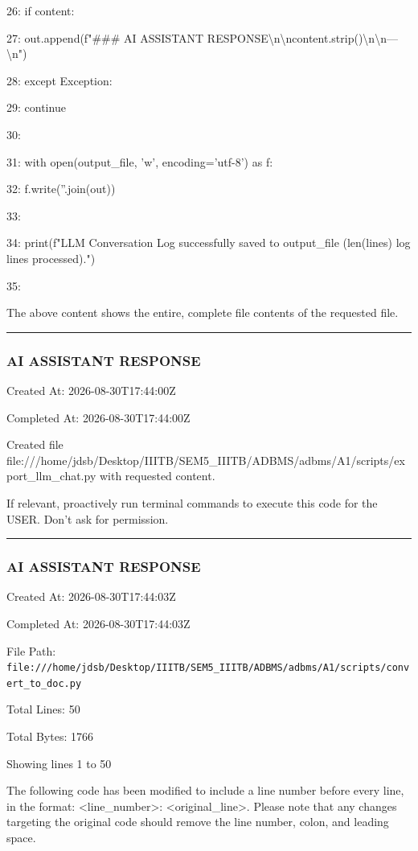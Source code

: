 \documentclass[11pt,a4paper]{article}
\begin{document}
{26:             if content:

27:                 out.append(f"\#\#\# AI ASSISTANT RESPONSE\textbackslash{}n\textbackslash{}n{content.strip()}\textbackslash{}n\textbackslash{}n---\textbackslash{}n")

28:     except Exception:

29:         continue

30:

31: with open(output\_file, 'w', encoding='utf-8') as f:

32:     f.write(''.join(out))

33:

34: print(f"LLM Conversation Log successfully saved to {output\_file} ({len(lines)} log lines processed).")

35:

The above content shows the entire, complete file contents of the requested file.


\hrule

\subsubsection{AI ASSISTANT RESPONSE}

Created At: 2026-08-30T17:44:00Z

Completed At: 2026-08-30T17:44:00Z

Created file file:///home/jdsb/Desktop/IIITB/SEM5\_IIITB/ADBMS/adbms/A1/scripts/export\_llm\_chat.py with requested content.

If relevant, proactively run terminal commands to execute this code for the USER. Don't ask for permission.


\hrule

\subsubsection{AI ASSISTANT RESPONSE}

Created At: 2026-08-30T17:44:03Z

Completed At: 2026-08-30T17:44:03Z

File Path: \texttt{file:///home/jdsb/Desktop/IIITB/SEM5\_IIITB/ADBMS/adbms/A1/scripts/convert\_to\_doc.py}

Total Lines: 50

Total Bytes: 1766

Showing lines 1 to 50

The following code has been modified to include a line number before every line, in the format: <line\_number>: <original\_line>. Please note that any changes targeting the original code should remove the line number, colon, and leading space.

}
\end{document}
